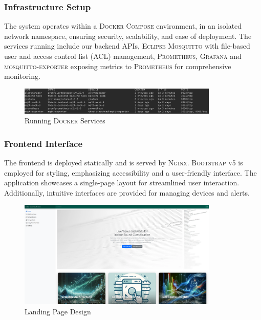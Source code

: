 \subsubsection{Infrastructure Setup}
The system operates within a \textsc{Docker Compose} environment, in an isolated network namespace, ensuring security, scalability, and ease of deployment. The services running include our backend APIs, \textsc{Eclipse Mosquitto} with file-based user and access control list (ACL) management, \textsc{Prometheus}, \textsc{Grafana} and \textsc{mosquitto-exporter} exposing metrics to \textsc{Prometheus} for comprehensive monitoring.

\begin{figure}[htbp]
  \centering
  \includegraphics[width=0.85\textwidth]{Pictures/dockerps}
  \caption{\label{fig:dockerps}Running \textsc{Docker} Services}
\end{figure}

\subsubsection{Frontend Interface}
The frontend is deployed statically and is served by \textsc{Nginx}. \textsc{Bootstrap v5} is employed for styling, emphasizing accessibility and a user-friendly interface. The application showcases a single-page layout for streamlined user interaction. Additionally, intuitive interfaces are provided for managing devices and alerts.

\begin{figure}[htbp]
  \centering
  \includegraphics[width=0.85\textwidth]{Pictures/home}
  \caption{\label{fig:schome}Landing Page Design}
\end{figure}

